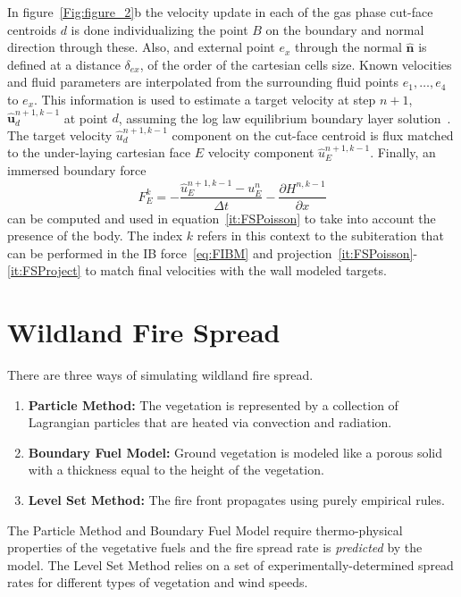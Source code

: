 \documentclass[journal,article,atmosphere,submit,moreauthors,pdftex]{Definitions/mdpi}
\begin{document}
In figure~\ref{Fig:figure_2}b the velocity update in each of the gas phase cut-face centroids $d$ is done individualizing the point $B$ on the boundary and normal direction through these. Also, and external point $e_x$ through the normal $\mathbf{\hat{n}}$ is defined at a distance $\delta_{ex}$, of the order of the cartesian cells size. Known velocities and fluid parameters are interpolated from the surrounding fluid points $e_1,\dots,e_4$ to $e_x$.
This information is used to estimate a target velocity at step $n+1$, $\mathbf{\hat{u}}_d^{n+1,k-1}$ at point $d$, assuming the log law equilibrium boundary layer solution~\cite{mcgratta_2013}. The target velocity $\hat{u}_d^{n+1,k-1}$ component on the cut-face centroid is flux matched to the under-laying cartesian face $E$ velocity component $\hat{u}_E^{n+1,k-1}$. Finally, an immersed boundary force
%
\begin{equation}
F_E^k=-\frac{\hat{u}_E^{n+1,k-1}-u_E^{n}}{\Delta t} - \frac{\partial H^{n,k-1}}{\partial x}
\label{eq:FIBM}
\end{equation}
%
can be computed and used in equation~\eqref{it:FSPoisson} to take into account the presence of the body. The index $k$ refers in this context to the subiteration that can be performed in the IB force~\eqref{eq:FIBM} and projection~\eqref{it:FSPoisson}-\eqref{it:FSProject} to match final velocities with the wall modeled targets.


\section{Wildland Fire Spread} \label{sec:firespread}

There are three ways of simulating wildland fire spread.

\begin{enumerate}
\item {\bf Particle Method:} The vegetation is represented by a collection of Lagrangian particles that are heated via convection and radiation.
\item {\bf Boundary Fuel Model:} Ground vegetation is modeled like a porous solid with a thickness equal to the height of the vegetation.
\item {\bf Level Set Method:} The fire front propagates using purely empirical rules.
\end{enumerate}
The Particle Method and Boundary Fuel Model require thermo-physical properties of the vegetative fuels and the fire spread rate is {\em predicted} by the model. The Level Set Method relies on a set of experimentally-determined spread rates for different types of vegetation and wind speeds.
\end{document}
